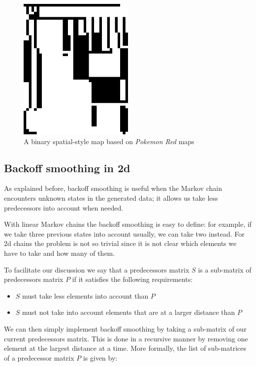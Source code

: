 \documentclass[A4paper,]{article}
\providecommand{\tightlist}{%
  \setlength{\itemsep}{0pt}\setlength{\parskip}{0pt}}
\begin{document}
\begin{figure}
\centering
\includegraphics[width=0.50000\textwidth]{../data/pokemon-red/generated/250n-3k-binary/image/6.png}
\caption{A binary spatial-style map based on \emph{Pokemon Red}
maps}\label{fig:red-binary}
\end{figure}

\subsection{Backoff smoothing in 2d}\label{sec:backoff}

As explained before, backoff smoothing is useful when the Markov chain
encounters unknown states in the generated data; it allows us take less
predecessors into account when needed.

With linear Markov chains the backoff smoothing is easy to define: for
example, if we take three previous states into account usually, we can
take two instead. For 2d chains the problem is not so trivial since it
is not clear which elements we have to take and how many of them.

To facilitate our discussion we say that a predecessors matrix \(S\) is
a sub-matrix of predecessors matrix \(P\) if it satisfies the following
requirements:

\begin{itemize}
\tightlist
\item
  \(S\) must take less elements into account than \(P\)
\item
  \(S\) must not take into account elements that are at a larger
  distance than \(P\)
\end{itemize}

We can then simply implement backoff smoothing by taking a sub-matrix of
our current predecessors matrix. This is done in a recursive manner by
removing one element at the largest distance at a time. More formally,
the list of sub-matrices of a predecessor matrix \(P\) is given by:
\end{document}
